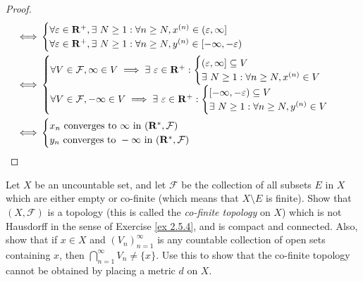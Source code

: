 \begin{proof}
\begin{align*}
        \iff & \begin{cases}
                   \forall \varepsilon \in \R^+, \exists\ N \geq 1 : \forall n \geq N, x^{(n)} \in (\varepsilon, \infty] \\
                   \forall \varepsilon \in \R^+, \exists\ N \geq 1 : \forall n \geq N, y^{(n)} \in [-\infty, -\varepsilon)
               \end{cases} \\
        \iff & \begin{cases}
                   \forall V \in \mathcal{F}, \infty \in V \implies \exists\ \varepsilon \in \R^+ : \begin{cases}
                                                                                                 (\varepsilon, \infty] \subseteq V \\
                                                                                                 \exists\ N \geq 1 : \forall n \geq N, x^{(n)} \in V
                                                                                             \end{cases} \\
                   \forall V \in \mathcal{F}, -\infty \in V \implies \exists\ \varepsilon \in \R^+ : \begin{cases}
                                                                                                  [-\infty, -\varepsilon) \subseteq V \\
                                                                                                  \exists\ N \geq 1 : \forall n \geq N, y^{(n)} \in V
                                                                                              \end{cases}
               \end{cases}                   \\
        \iff & \begin{cases}
                   x_n \text{ converges to } \infty \text{ in } (\R^*, \mathcal{F})  \\
                   y_n \text{ converges to } -\infty \text{ in } (\R^*, \mathcal{F}) \\
               \end{cases}
    \end{align*}
\end{proof}

\begin{exercise}\label{ex 2.5.6}
    Let \(X\) be an uncountable set, and let \(\mathcal{F}\) be the collection of all subsets \(E\) in \(X\) which are either empty or co-finite (which means that \(X \setminus E\) is finite).
    Show that \((X, \mathcal{F})\) is a topology (this is called the \emph{co-finite topology} on \(X\)) which is not Hausdorff in the sense of Exercise \ref{ex 2.5.4}, and is compact and connected.
    Also, show that if \(x \in X\) and \((V_n)_{n = 1}^\infty\) is any countable collection of open sets containing \(x\), then \(\bigcap_{n = 1}^\infty V_n \neq \{x\}\).
    Use this to show that the co-finite topology cannot be obtained by placing a metric \(d\) on \(X\).
\end{exercise}

